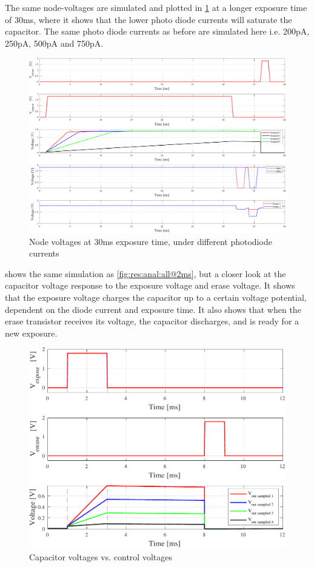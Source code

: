 The same node-voltages are simulated and plotted in \cref{fig:res:anal:all@30ms} at a longer exposure time of 30ms, where it shows that the lower photo diode currents will saturate the capacitor. 
The same photo diode currents as before are simulated here i.e. 200pA, 250pA, 500pA and 750pA.

\begin{figure}[H]
    \centering
    \includegraphics[width=\textwidth]{Images/Analog_plots/all_in_1@30ms.pdf}
    \caption{Node voltages at 30ms exposure time, under different photodiode currents}
    \label{fig:res:anal:all@30ms}
\end{figure}

 shows the same simulation as \cref{fig:res:anal:all@2ms}, but a closer look at the capacitor voltage response to the exposure voltage and erase voltage. 
It shows that the exposure voltage charges the capacitor up to a certain voltage potential, dependent on the diode current and exposure time. 
It also shows that when the erase transistor receives its voltage, the capacitor discharges, and is ready for a new exposure. 

\begin{figure}[H]
    \centering
    \includegraphics[width=\textwidth]{Images/Analog_plots/exp_eras_sample_m_voltage.pdf}
    \caption{Capacitor voltages vs. control voltages}
    \label{fig:res:anal:all2}
\end{figure}

